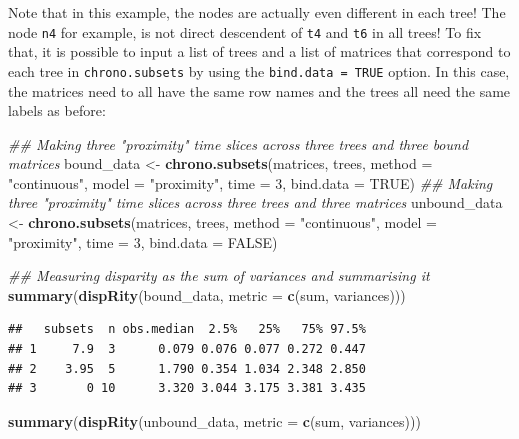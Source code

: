 \documentclass[
]{book}
\newenvironment{Shaded}{\begin{snugshade}}{\end{snugshade}}
\newcommand{\CommentTok}[1]{\textcolor[rgb]{0.56,0.35,0.01}{\textit{#1}}}
\newcommand{\DataTypeTok}[1]{\textcolor[rgb]{0.13,0.29,0.53}{#1}}
\newcommand{\DecValTok}[1]{\textcolor[rgb]{0.00,0.00,0.81}{#1}}
\newcommand{\KeywordTok}[1]{\textcolor[rgb]{0.13,0.29,0.53}{\textbf{#1}}}
\newcommand{\NormalTok}[1]{#1}
\newcommand{\OtherTok}[1]{\textcolor[rgb]{0.56,0.35,0.01}{#1}}
\newcommand{\StringTok}[1]{\textcolor[rgb]{0.31,0.60,0.02}{#1}}
\begin{document}
Note that in this example, the nodes are actually even different in each tree! The node \texttt{n4} for example, is not direct descendent of \texttt{t4} and \texttt{t6} in all trees!
To fix that, it is possible to input a list of trees and a list of matrices that correspond to each tree in \texttt{chrono.subsets} by using the \texttt{bind.data\ =\ TRUE} option.
In this case, the matrices need to all have the same row names and the trees all need the same labels as before:

\begin{Shaded}
\begin{Highlighting}[]
\CommentTok{\#\# Making three "proximity" time slices across three trees and three bound matrices}
\NormalTok{bound\_data \textless{}{-}}\StringTok{ }\KeywordTok{chrono.subsets}\NormalTok{(matrices, trees,}
                             \DataTypeTok{method =} \StringTok{"continuous"}\NormalTok{,}
                             \DataTypeTok{model =} \StringTok{"proximity"}\NormalTok{,}
                             \DataTypeTok{time =} \DecValTok{3}\NormalTok{,}
                             \DataTypeTok{bind.data =} \OtherTok{TRUE}\NormalTok{)}
\CommentTok{\#\# Making three "proximity" time slices across three trees and three matrices}
\NormalTok{unbound\_data \textless{}{-}}\StringTok{ }\KeywordTok{chrono.subsets}\NormalTok{(matrices, trees,}
                               \DataTypeTok{method =} \StringTok{"continuous"}\NormalTok{,}
                               \DataTypeTok{model =} \StringTok{"proximity"}\NormalTok{,}
                               \DataTypeTok{time =} \DecValTok{3}\NormalTok{,}
                               \DataTypeTok{bind.data =} \OtherTok{FALSE}\NormalTok{)}

\CommentTok{\#\# Measuring disparity as the sum of variances and summarising it}
\KeywordTok{summary}\NormalTok{(}\KeywordTok{dispRity}\NormalTok{(bound\_data, }\DataTypeTok{metric =} \KeywordTok{c}\NormalTok{(sum, variances)))}
\end{Highlighting}
\end{Shaded}

\begin{verbatim}
##   subsets  n obs.median  2.5%   25%   75% 97.5%
## 1     7.9  3      0.079 0.076 0.077 0.272 0.447
## 2    3.95  5      1.790 0.354 1.034 2.348 2.850
## 3       0 10      3.320 3.044 3.175 3.381 3.435
\end{verbatim}

\begin{Shaded}
\begin{Highlighting}[]
\KeywordTok{summary}\NormalTok{(}\KeywordTok{dispRity}\NormalTok{(unbound\_data, }\DataTypeTok{metric =} \KeywordTok{c}\NormalTok{(sum, variances)))}
\end{Highlighting}
\end{Shaded}
\end{document}
